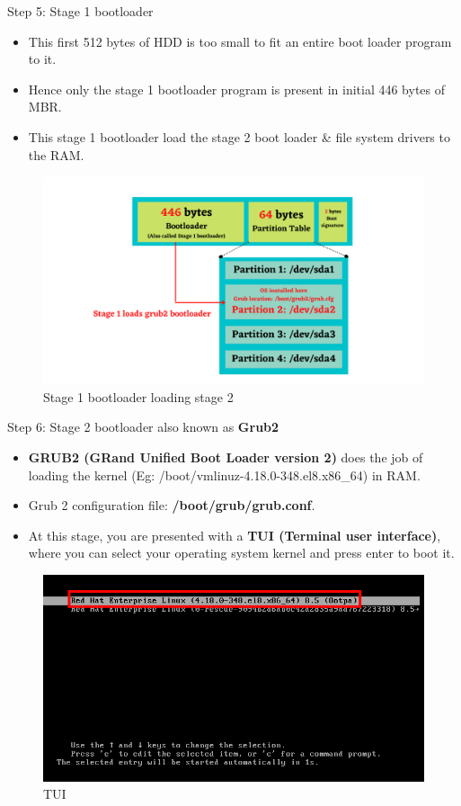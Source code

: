 \setlength{\columnsep}{3pt}
\begin{flushleft}
\bigskip
Step 5: Stage 1 bootloader

\begin{itemize}
	\item This first 512 bytes of HDD is too small to fit an entire boot loader program to it.
	\item Hence only the stage 1 bootloader program is present in initial 446 bytes of MBR.
	\item This stage 1  bootloader load the stage 2 boot loader \& file system drivers to the RAM.
\end{itemize}

\begin{figure}[h!]
	\centering
	\includegraphics[scale=0.6]{content/chapter17/images/grub2.png}
	\caption{Stage 1 bootloader loading stage 2}
	\label{fig:stage}
\end{figure}

\newpage
Step 6: Stage 2 bootloader also known as \textbf{Grub2}
\begin{itemize}
	\item \textbf{GRUB2 (GRand Unified Boot Loader version 2)} does the job of loading the kernel (Eg: /boot/vmlinuz-4.18.0-348.el8.x86\_64) in RAM.
	\item Grub 2 configuration file: \textbf{/boot/grub/grub.conf}.
	\item At this stage, you are presented with a \textbf{TUI (Terminal user
	interface)}, where you can select your operating system kernel and press enter to boot it.
\end{itemize}
	
\begin{figure}[h!]
	\centering
	\includegraphics[scale=0.5]{content/chapter17/images/grub_tui.png}
	\caption{TUI}
	\label{fig:stage}
\end{figure}


\end{flushleft}
